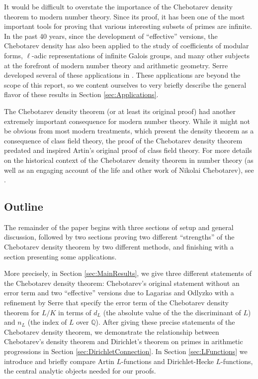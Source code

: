 \documentclass[12pt]{amsart}
\theoremstyle{definition}
\theoremstyle{remark}
\numberwithin{equation}{section}
\newcommand{\bbQ}{\mathbb Q}
\begin{document}


It would be difficult to overstate the importance of the Chebotarev density theorem to modern number theory. Since its proof, it has been one of the most important tools for proving that various interesting subsets of primes are infinite. In the past 40 years, since the development of ``effective'' versions, the Chebotarev density has also been applied to the study of coefficients of modular forms, $\ell$-adic representations of infinite Galois groups, and many other subjects at the forefront of modern number theory and arithmetic geometry. Serre developed several of these applications in \cite{Serre81}. These applications are beyond the scope of this report, so we content ourselves to very briefly describe the general flavor of these results in Section \ref{sec:Applications}.

The Chebotarev density theorem (or at least its original proof) had another extremely important consequence for modern number theory.
While it might not be obvious from most modern treatments, which present the density theorem as a consequence of class field theory, the proof of the Chebotarev density theorem predated and inspired Artin's original proof of class field theory. For more details on the historical context of the Chebotarev density theorem in number theory (as well as an engaging account of the life and other work of Nikolai Chebotarev), see \cite{StevenhagenLenstra96}.

\subsection{Outline}
The remainder of the paper begins with three sections of setup and general discussion, followed by two sections proving two different ``strengths'' of the Chebotarev density theorem by two different methods, and finishing with a section presenting some applications.

More precisely, in Section \ref{sec:MainResults}, we give three different statements of the Chebotarev density theorem: Chebotarev's original statement without an error term and two ``effective'' versions due to Lagarias and Odlyzko \cite{LagariasOdlyzko77} with a refinement by Serre \cite{Serre81} that specify the error term of the Chebotarev density theorem for $L/K$ in terms of $d_{L}$ (the absolute value of the the discriminant of $L$) and $n_{L}$ (the index of $L$ over $\bbQ$). After giving these precise statements of the Chebotarev density theorem, we demonstrate the relationship between Chebotarev's density theorem and Dirichlet's theorem on primes in arithmetic progressions in Section \ref{sec:DirichletConnection}. In Section \ref{sec:LFunctions} we introduce and briefly compare Artin $L$-functions and Dirichlet-Hecke $L$-functions, the central analytic objects needed for our proofs. 
\end{document}
